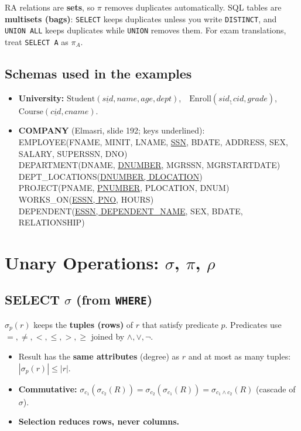 \documentclass[10pt,a4paper]{article}
\newcommand{\R}[1]{\mathrm{#1}}          %
\begin{document}
\begin{warnbox}
RA relations are \textbf{sets}, so $\pi$ removes duplicates automatically. SQL tables are \textbf{multisets (bags)}: \texttt{SELECT} keeps duplicates unless you write \texttt{DISTINCT}, and \texttt{UNION ALL} keeps duplicates while \texttt{UNION} removes them. For exam translations, treat \texttt{SELECT A} as $\pi_A$.
\end{warnbox}

\subsection*{Schemas used in the examples}
\begin{itemize}
  \item \textbf{University:} $\R{Student}(\underline{sid}, name, age, dept)$,\ \ $\R{Enroll}(\underline{sid, cid}, grade)$,\ \ $\R{Course}(\underline{cid}, cname)$.
  \item \small\textbf{COMPANY} (Elmasri, slide 192; keys underlined):\\
  EMPLOYEE(FNAME, MINIT, LNAME, \underline{SSN}, BDATE, ADDRESS, SEX, SALARY, SUPERSSN, DNO)\\
  DEPARTMENT(DNAME, \underline{DNUMBER}, MGRSSN, MGRSTARTDATE)\\
  DEPT\_LOCATIONS(\underline{DNUMBER, DLOCATION})\\
  PROJECT(PNAME, \underline{PNUMBER}, PLOCATION, DNUM)\\
  WORKS\_ON(\underline{ESSN, PNO}, HOURS)\\
  DEPENDENT(\underline{ESSN, DEPENDENT\_NAME}, SEX, BDATE, RELATIONSHIP)
\end{itemize}

\section{Unary Operations: $\sigma$, $\pi$, $\rho$}

\subsection{SELECT $\sigma$ (from \texttt{WHERE})}
$\sigma_{p}(r)$ keeps the \textbf{tuples (rows)} of $r$ that satisfy predicate $p$. Predicates use $=,\neq,<,\le,>,\ge$ joined by $\wedge,\vee,\neg$.
\begin{itemize}
  \item Result has the \textbf{same attributes} (degree) as $r$ and at most as many tuples: $|\sigma_p(r)| \le |r|$.
  \item \textbf{Commutative:} $\sigma_{c_1}(\sigma_{c_2}(R)) = \sigma_{c_2}(\sigma_{c_1}(R)) = \sigma_{c_1 \wedge c_2}(R)$ (cascade of $\sigma$).
  \item \textbf{Selection reduces rows, never columns.}
\end{itemize}
\end{document}
